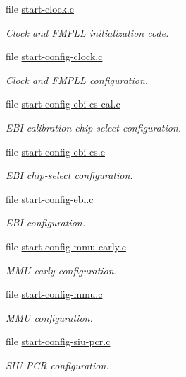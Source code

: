 \begin{DoxyCompactItemize}
file \mbox{\hyperlink{start-clock_8c}{start-\/clock.\+c}}
\begin{DoxyCompactList}\small\item\em Clock and F\+M\+P\+LL initialization code. \end{DoxyCompactList}\item 
file \mbox{\hyperlink{start-config-clock_8c}{start-\/config-\/clock.\+c}}
\begin{DoxyCompactList}\small\item\em Clock and F\+M\+P\+LL configuration. \end{DoxyCompactList}\item 
file \mbox{\hyperlink{start-config-ebi-cs-cal_8c}{start-\/config-\/ebi-\/cs-\/cal.\+c}}
\begin{DoxyCompactList}\small\item\em E\+BI calibration chip-\/select configuration. \end{DoxyCompactList}\item 
file \mbox{\hyperlink{start-config-ebi-cs_8c}{start-\/config-\/ebi-\/cs.\+c}}
\begin{DoxyCompactList}\small\item\em E\+BI chip-\/select configuration. \end{DoxyCompactList}\item 
file \mbox{\hyperlink{start-config-ebi_8c}{start-\/config-\/ebi.\+c}}
\begin{DoxyCompactList}\small\item\em E\+BI configuration. \end{DoxyCompactList}\item 
file \mbox{\hyperlink{start-config-mmu-early_8c}{start-\/config-\/mmu-\/early.\+c}}
\begin{DoxyCompactList}\small\item\em M\+MU early configuration. \end{DoxyCompactList}\item 
file \mbox{\hyperlink{start-config-mmu_8c}{start-\/config-\/mmu.\+c}}
\begin{DoxyCompactList}\small\item\em M\+MU configuration. \end{DoxyCompactList}\item 
file \mbox{\hyperlink{start-config-siu-pcr_8c}{start-\/config-\/siu-\/pcr.\+c}}
\begin{DoxyCompactList}\small\item\em S\+IU P\+CR configuration. \end{DoxyCompactList}\item 

\end{DoxyCompactItemize}

